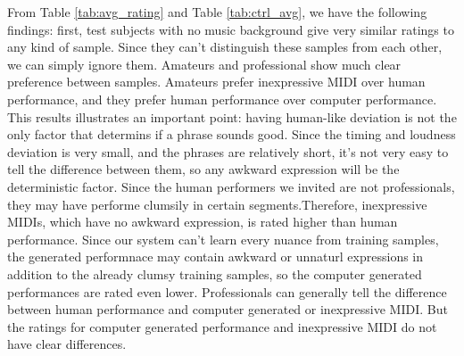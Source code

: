 From Table \ref{tab:avg_rating} and Table \ref{tab:ctrl_avg}, we have the following findings: first, test subjects with no music background give very similar ratings to any kind of sample. Since they can't distinguish these samples from each other, we can simply ignore them. Amateurs and professional show much clear preference between samples. Amateurs prefer inexpressive MIDI over human performance, and they prefer human performance over computer performance. This results illustrates an important point: having human-like deviation is not the only factor that determins if a phrase sounds good. Since the timing and loudness deviation is very small, and the phrases are relatively short, it's not very easy to tell the difference between them, so any awkward expression will be the deterministic factor. Since the human performers we invited are not professionals, they may have performe clumsily in certain segments.Therefore, inexpressive MIDIs, which have no awkward expression, is rated higher than human performance. Since our system can't learn every nuance from training samples, the generated performnace may contain awkward or unnaturl expressions in addition to the already clumsy training samples, so the computer generated performances are rated even lower. Professionals can generally tell the difference between human performance and computer generated or inexpressive MIDI. But the ratings for computer generated performance and inexpressive MIDI do not have clear differences.




